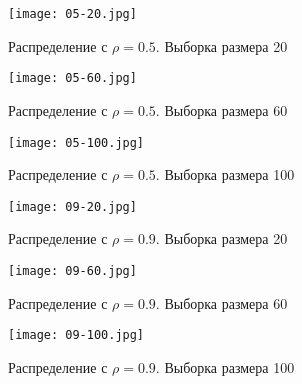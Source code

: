 \documentclass[main.tex]{subfiles}
\begin{document}
\begin{figure}[H]
	\centering \texttt{[image: 05-20.jpg]}
	\caption{Распределение с $\rho=0.5$. Выборка размера 20}
\end{figure}
\begin{figure}[H]
	\centering \texttt{[image: 05-60.jpg]}
	\caption{Распределение с $\rho=0.5$. Выборка размера 60}
\end{figure}
\begin{figure}[H]
	\centering \texttt{[image: 05-100.jpg]}
	\caption{Распределение с $\rho=0.5$. Выборка размера 100}
\end{figure}

\begin{figure}[H]
	\centering \texttt{[image: 09-20.jpg]}
	\caption{Распределение с $\rho=0.9$. Выборка размера 20}
\end{figure}
\begin{figure}[H]
	\centering \texttt{[image: 09-60.jpg]}
	\caption{Распределение с $\rho=0.9$. Выборка размера 60}
\end{figure}
\begin{figure}[H]
	\centering \texttt{[image: 09-100.jpg]}
	\caption{Распределение с $\rho=0.9$. Выборка размера 100}
\end{figure}
\end{document}
